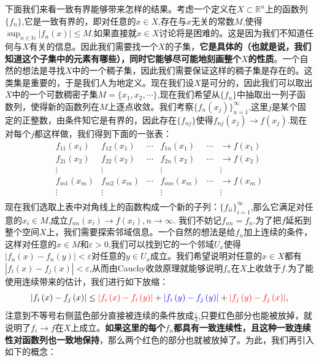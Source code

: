 \documentclass{article}
\begin{document}
下面我们来看一致有界能够带来怎样的结果。考虑一个定义在$X\subset\mathbb{R}^n$上的函数列$\{f_n\}$,它是一致有界的，即对任意的$x\in X$,存在与$x$无关的常数$M$,使得$\sup_{n\in\mathbb{N}}|f_n(x)|\le M$.如果直接就$x\in X$讨论将是困难的。这是因为我们不知道任何与$X$有关的信息。因此我们需要找一个$X$的子集，\textbf{它是具体的（也就是说，我们知道这个子集中的元素有哪些），同时它能够尽可能地刻画整个$X$的性质}。一个自然的想法是寻找$X$中的一个稠子集，因此我们需要保证这样的稠子集是存在的。这类集是重要的，于是我们人为地定义。现在我们设$X$是可分的，因此我们可以取出$X$中的一个可数稠密子集$M=\{x_1,x_2,\cdots\}$,现在我们希望从$\{f_n\}$中抽取出一列子函数列，使得新的函数列在$M$上逐点收敛。我们考察$\{f_n(x_j)\}_{n=1}^\infty$,这里$j$是某个固定的正整数，由条件知它是有界的，因此存在$\{f_{nj}\}$使得$f_{nj}(x_j)\to f(x_j)$.现在对每个$j$都这样做，我们得到下面的一张表：
$$
\begin{matrix}
	f_{11}\left( x_1 \right)&		f_{12}\left( x_1 \right)&		\cdots&		f_{1n}\left( x_1 \right)&		\cdots&		\rightarrow f\left( x_1 \right)\\
	f_{21}\left( x_2 \right)&		f_{22}\left( x_2 \right)&		\cdots&		f_{2n}\left( x_2 \right)&		\cdots&		\rightarrow f\left( x_2 \right)\\
	\vdots&		\vdots&		&		\vdots&		&		\vdots\\
	f_{m1}\left( x_m \right)&		f_{m2}\left( x_m \right)&		\cdots&		f_{mn}\left( x_m \right)&		\cdots&		\rightarrow f\left( x_m \right)\\
	\vdots&		\vdots&		&		\vdots&		&		\vdots\\
\end{matrix}
$$
现在我们选取上表中对角线上的函数构成一个新的子列：$\{f_{ii}\}_{i=1}^\infty$,那么它满足对任意的$x_i\in M$,成立$f_{nn}(x_i)\to f(x_i),n\to\infty$. 我们不妨记$f_{nn}=f_n$.为了把$f$延拓到整个空间$X$上，我们需要探索邻域信息。一个自然的想法是给$f_n$加上连续的条件，这样对任意的$x\in M$和$\varepsilon>0$,我们可以找到它的一个邻域$U_x$使得$|f_n(x)-f_n(y)|<\varepsilon$对任意的$y\in U_x$成立。我们希望说明对任意的$x\in X$都有$|f_{i}(x)-f_{j}(x)|<\varepsilon$,从而由Cauchy收敛原理就能够说明$f_n$在$X$上收敛于$f$.为了能使用连续带来的估计，我们进行如下放缩：
$$
\left| f_i\left( x \right) -f_j\left( x \right) \right|\le {\color{red} \left| f_i\left( x \right) -f_i\left( y \right) \right|}+{\color[RGB]{0, 0, 240} \left| f_i\left( y \right) -f_j\left( y \right) \right|}+{\color{red} \left| f_j\left( y \right) -f_j\left( x \right) \right|},
$$
注意到不等号右侧蓝色部分直接被连续的条件放成$\frac{\varepsilon}{3}$,只要红色部分也能被放掉，就说明了$f_i\to f$在$X$上成立。\textbf{如果这里的每个$f_n$都具有一致连续性，且这种一致连续性对函数列也一致地保持}，那么两个红色的部分也就被放掉了。为此，我们再引入如下的概念：
\end{document}
